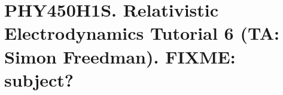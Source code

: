 
%

\chapter{PHY450H1S.  Relativistic Electrodynamics Tutorial 6 (TA: Simon Freedman).  FIXME: subject?}
\label{chap:relativisticElectrodynamicsT4}
{}
\date{Mar 17, 2011}

\beginArtWithToc

\section{}

\EndNoBibArticle
